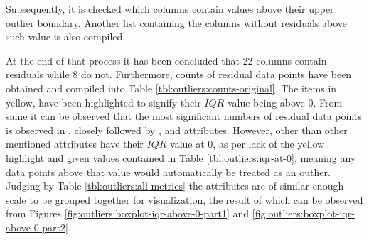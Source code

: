 Subsequently, it is checked which columns contain values above their upper outlier boundary. Another list containing the columns without residuals above such value is also compiled. 

At the end of that process it has been concluded that 22 columns contain residuals while 8 do not. Furthermore, counts of residual data points have been obtained and compiled into Table \ref{tbl:outliers:counts-original}. The items in yellow, have been highlighted to signify their $IQR$ value being above 0. From same it can be observed that the most significant numbers of residual data points is observed in \itUncoveredLines{}, closely followed by \overallUncoveredLines{}, \fileAgeInSec{} and \overallUncoveredConditions{} attributes. However, other than \fileAgeInSec{} other mentioned attributes have their $IQR$ value at 0, as per lack of the yellow highlight and given values contained in Table \ref{tbl:outliers:iqr-at-0}, meaning any data points above that value would automatically be treated as an outlier. Judging by Table \ref{tbl:outliers:all-metrics} the attributes are of similar enough scale to be grouped together for visualization, the result of which can be observed from Figures \ref{fig:outliers:boxplot-iqr-above-0-part1} and \ref{fig:outliers:boxplot-iqr-above-0-part2}. 

